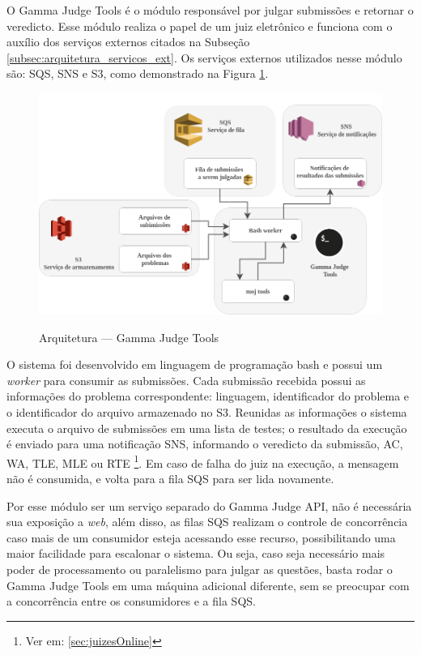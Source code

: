 
O Gamma Judge Tools é o módulo responsável por julgar submissões e retornar o veredicto. Esse módulo realiza o papel de um juiz eletrônico e funciona com o auxílio dos serviços externos citados na Subseção \ref{subsec:arquitetura_servicos_ext}. Os serviços externos utilizados nesse módulo são: SQS, SNS e S3, como demonstrado na Figura \ref{fig:arquitetura_goj_tools}.

\begin{figure}[H]
    \centering
    \caption{Arquitetura — Gamma Judge Tools}
    \includegraphics[keepaspectratio=true,scale=0.45]{figuras/arquitetura_goj_tools.png}
    \label{fig:arquitetura_goj_tools}
\end{figure}

O sistema foi desenvolvido em linguagem de programação bash e possui um \textit{worker} para consumir as submissões. Cada submissão recebida possui as informações do problema correspondente: linguagem, identificador do problema e o identificador do arquivo armazenado no S3. Reunidas as informações o sistema executa o arquivo de submissões em uma lista de testes; o resultado da execução é enviado para uma notificação SNS, informando o veredicto da submissão, AC, WA, TLE, MLE ou RTE \footnote{Ver em: \ref{sec:juizesOnline}}. Em caso de falha do juiz na execução, a mensagem não é consumida, e volta para a fila SQS para ser lida novamente.

Por esse módulo ser um serviço separado do Gamma Judge API, não é necessária sua exposição a \textit{web}, além disso, as filas SQS realizam o controle de concorrência caso mais de um consumidor esteja acessando esse recurso, possibilitando uma maior facilidade para escalonar o sistema. Ou seja, caso seja necessário mais poder de processamento ou paralelismo para julgar as questões, basta rodar o Gamma Judge Tools em uma máquina adicional diferente, sem se preocupar com a concorrência entre os consumidores e a fila SQS. 


